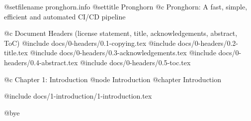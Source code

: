 
@setfilename pronghorn.info
@settitle Pronghorn
@c Pronghorn: A fast, simple, efficient and automated CI/CD pipeline


@c Document Headers (license statement, title, acknowledgements, abstract, ToC)
@include docs/0-headers/0.1-copying.tex
@include docs/0-headers/0.2-title.tex
@include docs/0-headers/0.3-acknowledgements.tex
@include docs/0-headers/0.4-abstract.tex
@include docs/0-headers/0.5-toc.tex


@c Chapter 1: Introduction
@node Introduction
@chapter Introduction

@include docs/1-introduction/1-introduction.tex

@bye
